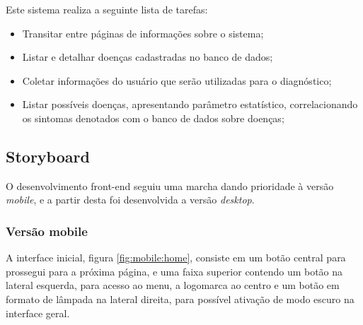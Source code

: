 Este sistema realiza a seguinte lista de tarefas:
\begin{itemize}
	\item Transitar entre páginas de informações sobre o sistema;
	\item Listar e detalhar doenças cadastradas no banco de dados;
	\item Coletar informações do usuário que serão utilizadas para o diagnóstico;
	\item Listar possíveis doenças, apresentando parâmetro estatístico, correlacionando os sintomas denotados com o banco de dados sobre doenças;
\end{itemize}

\subsection{Storyboard}

O desenvolvimento front-end seguiu uma marcha dando prioridade à versão \textit{mobile}, e a partir desta foi desenvolvida a versão \textit{desktop}.

\subsubsection{Versão mobile}

A interface inicial, figura \ref{fig:mobile:home}, consiste em um botão central para prossegui para a próxima página, e uma faixa superior contendo um botão na lateral esquerda, para acesso ao menu, a logomarca ao centro e um botão em formato de lâmpada na lateral direita, para possível ativação de modo escuro na interface geral.

